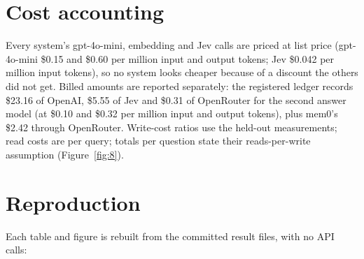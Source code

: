 \documentclass[11pt]{article}
\newcommand{\src}[1]{}
\begin{document}
\FloatBarrier
\section{Cost accounting}\label{app:H}
Every system's gpt-4o-mini, embedding and Jev calls are priced at list price (gpt-4o-mini \$0.15\src{src/engram/llm/openai.py\#PRICES/gpt-4o-mini/0 (USD per million)} and \$0.60\src{src/engram/llm/openai.py\#PRICES/gpt-4o-mini/1 (USD per million)} per million input and output tokens; Jev \$0.042\src{src/engram/config.py\#JEV\_PRICE\_PER\_INPUT\_TOKEN (per million)} per million input tokens), so no system looks cheaper because of a discount the others did not get. Billed amounts are reported separately: the registered ledger records \$23.16\src{bench/results/v3/spend.jsonl (sum of spend/openai)} of OpenAI, \$5.55\src{bench/results/v3/spend.jsonl (sum of spend/jev)} of Jev and \$0.31\src{bench/results/v3/spend.jsonl (sum of spend/openrouter)} of OpenRouter for the second answer model (at \$0.10\src{docs/V3\_PLAN.md §1, §2, §4} and \$0.32\src{docs/V3\_PLAN.md §1, §2, §4} per million input and output tokens), plus mem0's \$2.42\src{bench/results/v3/spend.jsonl\#correction/openrouter\_outside\_cap} through OpenRouter. Write-cost ratios use the held-out measurements; read costs are per query; totals per question state their reads-per-write assumption (Figure~\ref{fig:8}).

\FloatBarrier
\section{Reproduction}\label{app:I}
Each table and figure is rebuilt from the committed result files, with no API calls:
\end{document}
